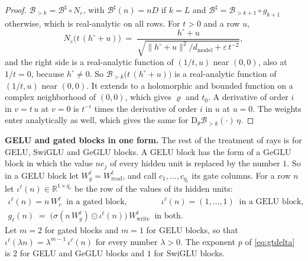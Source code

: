 \documentclass[10pt]{article}
\theoremstyle{definition}
\theoremstyle{remark}
\newcommand{\R}{\mathbb{R}}
\newcommand{\Wread}{W_{\mathrm{read}}}
\newcommand{\Wwrite}{W_{\mathrm{write}}}
\newcommand{\dm}{d_{\mathrm{model}}}
\newcommand{\Der}{\mathrm{D}}
\newcommand{\norm}[1]{\lVert #1\rVert}
\newcommand{\para}[1]{\smallskip\noindent\textbf{#1}\hspace{0.5em}}
\begin{document}
\begin{proof}
$\mathcal B_{>k} = \mathcal B^\sharp\circ N_\varepsilon$, with $\mathcal B^\sharp(n) = nD$ if $k = L$ and $\mathcal B^\sharp = \mathcal B_{>k+1}\circ g_{k+1}$ otherwise, which is real-analytic on all rows. For $t > 0$ and a row $u$,
\[
N_\varepsilon\big(t\,(h^\circ + u)\big) \;=\; \frac{h^\circ + u}{\sqrt{\norm{h^\circ + u}^2/\dm + \varepsilon\,t^{-2}}} ,
\]
and the right side is a real-analytic function of $(1/t, u)$ near $(0, 0)$, also at $1/t = 0$, because $h^\circ \neq 0$. So $\mathcal B_{>k}\big(t\,(h^\circ + u)\big)$ is a real-analytic function of $(1/t, u)$ near $(0, 0)$. It extends to a holomorphic and bounded function on a complex neighborhood of $(0, 0)$, which gives $\varrho$ and $t_0$. A derivative of order $i$ in $v = t\,u$ at $v = 0$ is $t^{-i}$ times the derivative of order $i$ in $u$ at $u = 0$. The weights enter analytically as well, which gives the same for $\Der_\theta\mathcal B_{>k}(\cdot)\,\eta$.
\end{proof}

\para{GELU and gated blocks in one form.} The rest of the treatment of rays is for GELU, SwiGLU and GeGLU blocks. A GELU block has the form of a GeGLU block in which the value $ne_j$ of every hidden unit is replaced by the number $1$. So in a GELU block let $W_g^{\ell} = \Wread^{\ell}$, and call $c_1, \dots, c_{q_\ell}$ its gate columns. For a row $n$ let $\iota^{\ell}(n) \in \R^{1\times q_\ell}$ be the row of the values of its hidden units:
\begin{gather*}
\iota^{\ell}(n) = n\,W_v^{\ell} \ \text{ in a gated block}, \qquad\qquad \iota^{\ell}(n) = (1, \dots, 1) \ \text{ in a GELU block},\\
g_\ell(n) \;=\; \big(\sigma(n\,W_g^{\ell})\odot\iota^{\ell}(n)\big)\,\Wwrite^{\ell} \ \text{ in both.}
\end{gather*}
Let $m = 2$ for gated blocks and $m = 1$ for GELU blocks, so that $\iota^{\ell}(\lambda n) = \lambda^{m-1}\,\iota^{\ell}(n)$ for every number $\lambda > 0$. The exponent $p$ of \eqref{eq:gtdelta} is $2$ for GELU and GeGLU blocks and $1$ for SwiGLU blocks.
\end{document}
